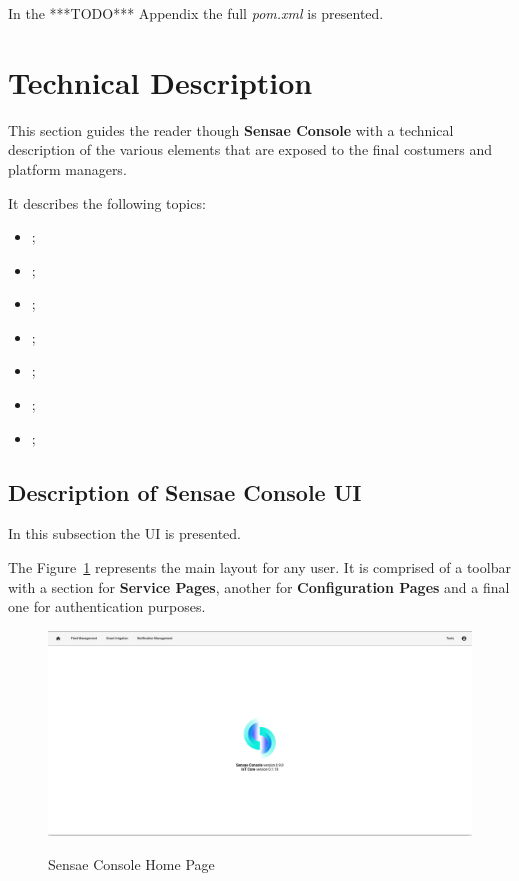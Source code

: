 In the \refname{***TODO***} Appendix the full \textit{pom.xml} is presented.

\section{Technical Description}
\label{sec:implementation:description}

This section guides the reader though \textbf{Sensae Console} with a technical description of the various elements that are exposed to the final costumers and platform managers.

It describes the following topics:

\begin{itemize}
    \item {};
    \item {};
    \item {};
    \item {};
    \item {};
    \item {};
    \item {};
\end{itemize}

\subsection{Description of Sensae Console UI}
\label{subsec:implementation:description:ui}

In this subsection the \gls{UI} is presented.

The Figure~\ref{fig:implementation:description:ui:home} represents the main layout for any user. It is comprised of a toolbar with a section for \textbf{Service Pages}, another for \textbf{Configuration Pages} and a final one for authentication purposes.

\begin{figure}[H]
    \centering
    \resizebox{\columnwidth}{!}
    {
       \includegraphics{assets/figures/ui/home.png}
    }
    \caption[Sensae Console Home Page]{Sensae Console Home Page}
    \label{fig:implementation:description:ui:home}
\end{figure}

